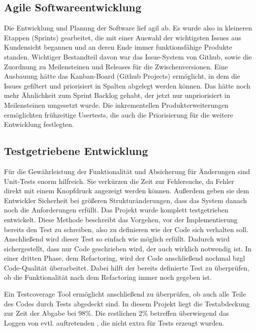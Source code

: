 \subsection{Agile Softwareentwicklung} %
\label{sub:agile_softwareentwicklung}
Die Entwicklung und Planung der Software lief agil ab. Es wurde also in kleineren Etappen (Sprints) gearbeitet, die mit einer Auswahl der wichtigsten Issues aus Kundensicht begannen und an deren Ende immer funktionsfähige Produkte standen. Wichtiger Bestandteil davon war das Issue-System von Github, sowie die Zuordnung zu Meilensteinen und Releases für die Zwischenversionen. Eine Ausbauung hätte das Kanban-Board (Github Projects) ermöglicht, in dem die Issues gefiltert und priorisiert in Spalten abgelegt werden können. Das hätte noch mehr Ähnlichkeit zum Sprint Backlog gehabt, der jetzt nur unpriorisiert in Meilensteinen umgesetzt wurde. Die inkrementellen Produkterweiterungen ermöglichten frühzeitige Usertests, die auch die Priorisierung für die weitere Entwicklung festlegten.

\subsection{Testgetriebene Entwicklung} %
\label{sub:testgetriebene_entwicklung}

Für die Gewährleistung der Funktionalität und Absicherung für Änderungen sind Unit-Tests enorm hilfreich. Sie verkürzen die Zeit zur Fehlersuche, da Fehler direkt mit einem Knopfdruck angezeigt werden können. Außerdem geben sie dem Entwickler Sicherheit bei größeren Strukturänderungen, dass das System danach noch die Anforderungen erfüllt. Das Projekt wurde komplett testgetrieben entwickelt. Diese Methode beschreibt das Vorgehen, vor der Implementierung bereits den Test zu schreiben, also zu definieren wie der Code sich verhalten soll. Anschließend wird dieser Test so einfach wie möglich erfüllt. Dadurch wird sichergestellt, dass nur Code geschrieben wird, der auch wirklich notwendig ist. In einer dritten Phase, dem Refactoring, wird der Code anschließend nochmal bzgl Code-Qualität überarbeitet. Dabei hilft der bereits definierte Test zu überprüfen, ob die Funktionalität nach dem Refactoring immer noch gegeben ist. 

Ein Testcoverage Tool ermöglicht anschließend zu überprüfen, ob auch alle Teile des Codes durch Tests abgedeckt sind. In diesem Projekt liegt die Testabdeckung zur Zeit der Abgabe bei 98\%. Die restlichen 2\% betreffen überwiegend das Loggen von evtl. auftretenden , die nicht extra für Tests erzeugt wurden.

